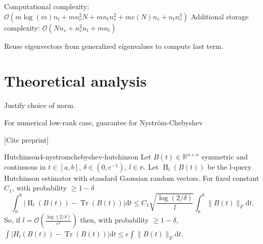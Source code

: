Computational complexity: $\mathcal{O}(m \log(m) n_t + m n_v^2 N + m n_t n_v^2 +  m c(N) n_v + n_t n_v^3)$
Additional storage complexity: $\mathcal{O}(N n_v + n_v^2 n_t + m n_t)$

Reuse eigenvectors from generalized eigenvalues to compute last term.


\section{Theoretical analysis}
\label{sec:4-nystromchebyshev-analysis}

Justify choice of norm.

For numerical low-rank case, guarantee for Nystr\"om-Chebyshev \cite[Theorem~9]{kressner2023randomized}

[Cite preprint]

\begin{lemma}{Hutchinson}{4-nystromchebyshev-hutchinson}
    Let $B(t) \in \mathbb{R}^{n \times n}$ symmetric and continuous in $t \in [a, b]$, $\delta \in (0, e^{-1})$, $l \in \mathbb{n}$. Let $\operatorname{H}_{l}(B(t))$ be the l-query Hutchinson estimator with standard Gaussian random vectors. For fixed constant $C_1$, with probability $\geq 1 - \delta$
    \begin{equation}
        \int_{a}^{b} \left| \operatorname{H}_{l}(B(t))  - \operatorname{Tr}(B(t)) \right| \mathrm{d}t \leq C_1 \sqrt{\frac{\log(2/\delta)}{l}} \int_{a}^{b} \lVert B(t) \rVert_F \mathrm{d}t.
    \end{equation}
    So, if $l = \mathcal{O}\left( \frac{\log(2/\delta)}{\epsilon^2} \right)$ then, with probability $\geq 1 - \delta$, $\int |H_l(B(t)) - \operatorname{Tr}(B(t))| \mathrm{d}t \leq \epsilon \int \lVert B(t) \rVert_F \mathrm{d}t$.
\end{lemma}

